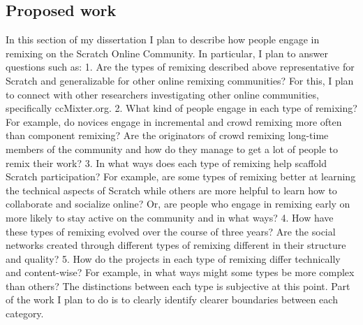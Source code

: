 \subsection{Proposed work}
In this section of my dissertation I plan to describe how people engage in remixing on the Scratch Online Community. 
In particular, I plan to answer questions such as:
1. Are the types of remixing described above representative for Scratch and generalizable for other online remixing communities? 
For this, I plan to connect with other researchers investigating other online communities, specifically ccMixter.org.
2. What kind of people engage in each type of remixing? For example, do novices engage in incremental and crowd remixing more often than component remixing? Are the originators of crowd remixing long-time members of the community and how do they manage to get a lot of people to remix their work?
3. In what ways does each type of remixing help scaffold Scratch participation? For example, are some types of remixing better at learning the technical aspects of Scratch while others are more helpful to learn how to collaborate and socialize online? Or, are people who engage in remixing early on more likely to stay active on the community and in what ways?
4. How have these types of remixing evolved over the course of three years?
Are the social networks created through different types of remixing different in their structure and quality?
5. How do the projects in each type of remixing differ technically and content-wise? For example, in what ways might some types be more complex than others?
The distinctions between each type is subjective at this point. Part of the work I plan to do is to clearly identify clearer boundaries between each category.

